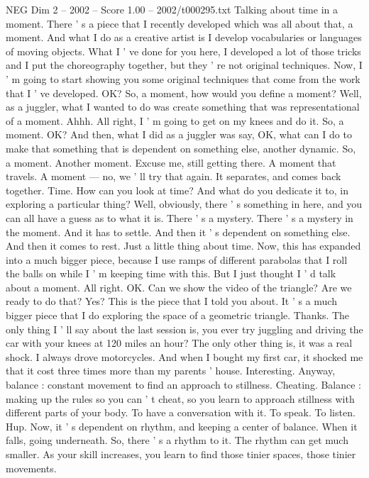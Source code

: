 \begin{textsample}{NEG Dim 2 – 2002 – Score 1.00 – 2002/t000295.txt}
Talking about time in a moment.
There ' s a piece that I recently developed which was all about that, a moment.
And what I do as a creative artist is I develop vocabularies or languages of moving objects.
What I ' ve done for you here, I developed a lot of those tricks and I put the choreography together, but they ' re not original techniques.
Now, I ' m going to start showing you some original techniques that come from the work that I ' ve developed.
OK?
So, a moment, how would you define a moment?
Well, as a juggler, what I wanted to do was create something that was representational of a moment.
Ahhh.
All right, I ' m going to get on my knees and do it.
So, a moment.
OK?
And then, what I did as a juggler was say, OK, what can I do to make that something that is dependent on something else, another dynamic.
So, a moment.
Another moment.
Excuse me, still getting there.
A moment that travels.
A moment — no, we ' ll try that again.
It separates, and comes back together.
Time.
How can you look at time?
And what do you dedicate it to, in exploring a particular thing?
Well, obviously, there ' s something in here, and you can all have a guess as to what it is.
There ' s a mystery.
There ' s a mystery in the moment.
And it has to settle.
And then it ' s dependent on something else.
And then it comes to rest.
Just a little thing about time.
Now, this has expanded into a much bigger piece, because I use ramps of different parabolas that I roll the balls on while I ' m keeping time with this.
But I just thought I ' d talk about a moment.
All right.
OK.
Can we show the video of the triangle?
Are we ready to do that?
Yes?
This is the piece that I told you about.
It ' s a much bigger piece that I do exploring the space of a geometric triangle.
Thanks.
The only thing I ' ll say about the last session is, you ever try juggling and driving the car with your knees at 120 miles an hour?
The only other thing is, it was a real shock.
I always drove motorcycles.
And when I bought my first car, it shocked me that it cost three times more than my parents ' house.
Interesting.
Anyway, balance : constant movement to find an approach to stillness.
Cheating.
Balance : making up the rules so you can ' t cheat, so you learn to approach stillness with different parts of your body.
To have a conversation with it.
To speak.
To listen.
Hup.
Now, it ' s dependent on rhythm, and keeping a center of balance.
When it falls, going underneath.
So, there ' s a rhythm to it.
The rhythm can get much smaller.
As your skill increases, you learn to find those tinier spaces, those tinier movements.

\end{textsample}
